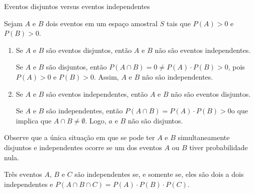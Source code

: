 \begin{example} {Eventos disjuntos versus eventos independentes}

Sejam \(A\) e \(B\) dois eventos em um espaço amostral \(S\) tais que \(P(A)>0\) e \(P(B)>0\).
\begin{enumerate}
\item {} 
Se \(A\) e \(B\) são eventos disjuntos, então \(A\) e \(B\) não são eventos independentes.

Se \(A\) e \(B\) são disjuntos, então \(P(A\cap B)=0\neq P(A)\cdot P(B)>0\), pois \(P(A)>0\) e \(P(B)>0\). Assim, \(A\) e \(B\) não são independentes.

\item {} 
Se \(A\) e \(B\) são eventos independentes, então $A$ e $B$ não são eventos disjuntos.

Se \(A\) e \(B\) são independentes, então \(P(A\cap B)=P(A)\cdot P(B)>0\)o que implica que \(A\cap B\neq \emptyset\). Logo, \(a\) e \(B\) não são disjuntos.

\end{enumerate}

Observe que a única situação em que se pode ter \(A\)  e \(B\)  simultaneamente disjuntos e independentes ocorre se um dos eventos \(A\) ou \(B\) tiver probabilidade nula.
\end{example}

\begin{observation}

Três eventos \(A\), \(B\)  e  \(C\) são independentes se, e somente se, eles são dois a dois independentes e \(P(A\cap B\cap C)=P(A)\cdot P(B)\cdot P(C)\).
\end{observation}

